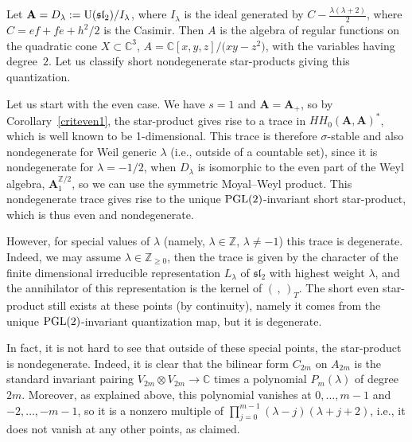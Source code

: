 \documentclass[pdftex]{sigma}
\numberwithin{equation}{section}
\begin{document}
\begin{Example}\label{repth}Let ${{\mathbf A}}=D_\lambda:={\rm U}(\mathfrak{sl}_2)/I_\lambda$, where
$I_\lambda$ is the ideal generated by $C-\frac{\lambda(\lambda+2)}{2}$, where $C=ef+fe+h^2/2$ is the Casimir. Then $A$ is the algebra of regular functions on the quadratic cone $X\subset {\mathbb C}^3$,
$A={\mathbb C}[x,y,z]/\big(xy-z^2\big)$, with the variables having degree~$2$. Let us classify short nondegenerate star-products giving this quantization.

Let us start with the even case. We have $s=1$ and ${\mathbf A}={\mathbf A}_+$, so by Corollary~\ref{criteven1}, the star-product gives rise to a trace in $HH_0({\mathbf A},{\mathbf A})^*$, which is well known to be 1-dimensional. This trace is therefore $\sigma$-stable and also nondegenerate for Weil generic $\lambda$ (i.e., outside of a countable set), since it is nondegenerate for $\lambda=-1/2$,
when $D_\lambda$ is isomorphic to the even part of the Weyl algebra, ${\mathbf A}_1^{{\mathbb Z}/2}$, so we can use the symmetric Moyal--Weyl product. This nondegenerate trace gives rise to the unique ${\rm PGL}(2)$-invariant short star-product, which is thus even and nondegenerate.

However, for special values of $\lambda$ (namely, $\lambda\in {\mathbb Z}$, $\lambda\ne -1$) this trace is degenerate. Indeed, we may assume $\lambda\in {\mathbb Z}_{\ge 0}$, then the trace is given by the character of the finite dimensional irreducible representation $L_\lambda$ of ${\mathfrak{sl}}_2$ with highest weight $\lambda$, and the annihilator of this representation is the kernel of $(\,,\,)_T$. The short even star-product still exists at these points (by continuity), namely it comes from the unique
${\rm PGL}(2)$-invariant quantization map, but it is degenerate.

In fact, it is not hard to see that outside of these special points, the star-product is nondegenerate.
Indeed, it is clear that the bilinear form $C_{2m}$ on $A_{2m}$ is the standard invariant pairing
$V_{2m}\otimes V_{2m}\to {\mathbb C}$ times a polynomial $P_m(\lambda)$ of degree~$2m$.
Moreover, as explained above, this polynomial vanishes at $0,\dots,m-1$ and $-2,\dots,-m-1$,
so it is a nonzero multiple of $\prod\limits_{j=0}^{m-1}(\lambda-j)(\lambda+j+2)$, i.e.,
it does not vanish at any other points, as claimed.


\end{Example}
\end{document}
